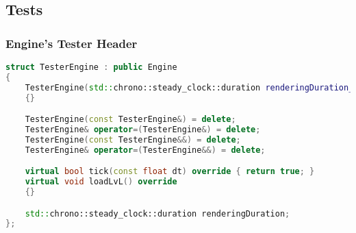 \newpage

\subsection{Tests}
\subsubsection{Engine's Tester Header}
\begin{lstlisting}[language=c++, caption=TesterEngine class (./engine/tests/tester.cpp)]
struct TesterEngine : public Engine
{
    TesterEngine(std::chrono::steady_clock::duration renderingDuration_) : renderingDuration{renderingDuration_}
    {}

    TesterEngine(const TesterEngine&) = delete;
    TesterEngine& operator=(TesterEngine&) = delete;
    TesterEngine(const TesterEngine&&) = delete;
    TesterEngine& operator=(TesterEngine&&) = delete;

    virtual bool tick(const float dt) override { return true; }
    virtual void loadLvL() override
    {}

    std::chrono::steady_clock::duration renderingDuration;
};
\end{lstlisting}
